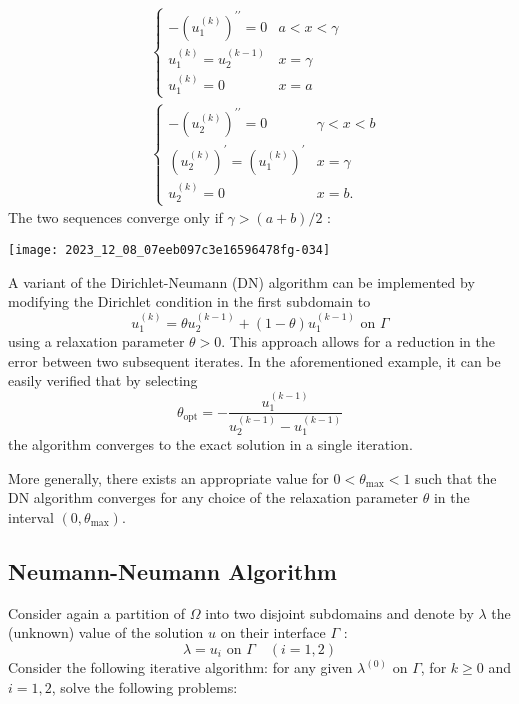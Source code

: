 \documentclass[11pt]{book}
\begin{document}
$$
\begin{aligned}
& \begin{cases}-\left(u_{1}^{(k)}\right)^{\prime \prime}=0 & a<x<\gamma \\
u_{1}^{(k)}=u_{2}^{(k-1)} & x=\gamma \\
u_{1}^{(k)}=0 & x=a\end{cases} \\
& \begin{cases}-\left(u_{2}^{(k)}\right)^{\prime \prime}=0 & \gamma<x<b \\
\left(u_{2}^{(k)}\right)^{\prime}=\left(u_{1}^{(k)}\right)^{\prime} & x=\gamma \\
u_{2}^{(k)}=0 & x=b .\end{cases}
\end{aligned}
$$
The two sequences converge only if $\gamma>(a+b) / 2$ :
\begin{center}
    \texttt{[image: 2023\_12\_08\_07eeb097c3e16596478fg-034]}
\end{center}
A variant of the Dirichlet-Neumann (DN) algorithm can be implemented by modifying the Dirichlet condition in the first subdomain to 
$$
u_{1}^{(k)}=\theta u_{2}^{(k-1)}+(1-\theta) u_{1}^{(k-1)} \text{ on } \Gamma
$$
using a relaxation parameter $\theta > 0$. This approach allows for a reduction in the error between two subsequent iterates.
In the aforementioned example, it can be easily verified that by selecting 
$$
\theta_{\text{opt}} = -\frac{u_{1}^{(k-1)}}{u_{2}^{(k-1)} - u_{1}^{(k-1)}}
$$
the algorithm converges to the exact solution in a single iteration.

More generally, there exists an appropriate value for $0 < \theta_{\max} < 1$ such that the DN algorithm converges for any choice of the relaxation parameter $\theta$ in the interval $(0, \theta_{\max})$.


\subsection*{Neumann-Neumann Algorithm}
Consider again a partition of $\Omega$ into two disjoint subdomains and denote by $\lambda$ the (unknown) value of the solution $u$ on their interface $\Gamma$ :
$$
\lambda=u_{i} \text { on } \Gamma \quad(i=1,2)
$$
Consider the following iterative algorithm: for any given $\lambda^{(0)}$ on $\Gamma$, for $k \geq 0$ and $i=1,2$, solve the following problems:
\end{document}
